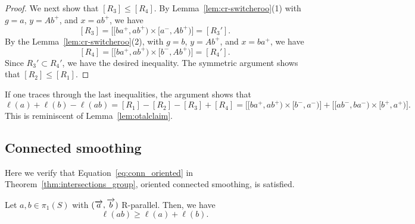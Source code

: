 \begin{proof}
We next show that $[R_3] \le [R_4]$. By Lemma~\ref{lem:cr-switcheroo}(1)
with $g=a$, $y=Ab^+$, and $x=ab^+$, we have
\[
  [R_3] = \bigl[[ba^+,ab^+) \times [a^-,Ab^+)\bigr] = [R_3'].
\]
By the Lemma~\ref{lem:cr-switcheroo}(2), with $g=b$, $y=Ab^+$, and $x=ba^+$, we have
\[
  [R_4] = \bigl[[ba^+,ab^+) \times [b^-,Ab^+)\bigr] = [R_4'].
\]
Since $R_3' \subset R_4'$, we have the desired inequality.
The symmetric argument shows that $[R_2] \le [R_1]$.
\end{proof}

\begin{remark}
  If one traces through the last inequalities, the argument shows that
  \[
    \ell(a) + \ell(b) - \ell(ab) = [R_1] - [R_2] - [R_3] + [R_4]
    = \bigl[[ba^+, ab^+) \times [b^-,a^-)\bigr]
      + \bigl[[ab^-,ba^-) \times [b^+,a^+)\bigr].
  \]
  This is reminiscent of Lemma~\ref{lem:otalclaim}.
\end{remark}

\subsection{Connected smoothing}

Here we verify that Equation~\eqref{eq:conn_oriented} in Theorem~\ref{thm:intersections_group}, oriented connected smoothing, is satisfied.

\begin{lemma}\label{lem:crossratio_connected_smoothing}
Let $a,b \in \pi_1(S)$ with $(\overrightarrow{a},\overrightarrow{b})$ R-parallel.
Then, we have
\[
\ell(ab) \geq \ell(a) + \ell(b).
\]
\end{lemma}

